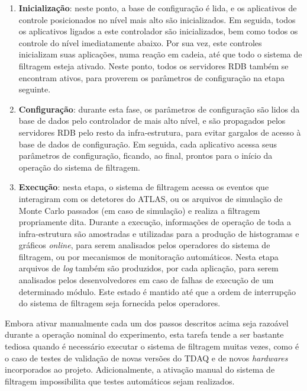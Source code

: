 \begin{enumerate}

\item \textbf{Inicialização}: neste ponto, a base de configuração é lida, e os aplicativos de controle posicionados no nível mais alto são inicializados. Em seguida, todos os aplicativos ligados a este controlador são inicializados, bem como todos os controle do nível imediatamente abaixo. Por sua vez, este controles inicializam suas aplicações, numa reação em cadeia, até que todo o sistema de filtragem esteja ativado. Neste ponto, todos os servidores RDB também se encontram ativos, para proverem os parâmetros de configuração na etapa seguinte.

\item \textbf{Configuração}: durante esta fase, os parâmetros de configuração são lidos da base de dados pelo controlador de mais alto nível, e são propagados pelos servidores RDB pelo resto da infra-estrutura, para evitar gargalos de acesso à base de dados de configuração. Em seguida, cada aplicativo acessa seus parâmetros de configuração, ficando, ao final, prontos para o início da operação do sistema de filtragem.

\item \textbf{Execução}: nesta etapa, o sistema de filtragem acessa os eventos que interagiram com os detetores do ATLAS, ou os arquivos de simulação de Monte Carlo passados (em caso de simulação) e realiza a filtragem propriamente dita. Durante a execução, informações de operação de toda a infra-estrutura são amostradas e utilizadas para a produção de histogramas e gráficos \emph{online}, para serem analisados pelos operadores do sistema de filtragem, ou por mecanismos de monitoração automáticos. Nesta etapa arquivos de \emph{log} também são produzidos, por cada aplicação, para serem analisados pelos desenvolvedores em caso de falhas de execução de um determinado módulo. Este estado é mantido até que a ordem de interrupção do sistema de filtragem seja fornecida pelos operadores.

\end{enumerate}

Embora ativar manualmente cada um dos passos descritos acima seja razoável durante a operação nominal do experimento, esta tarefa tende a ser bastante tediosa quando é necessário executar o sistema de filtragem muitas vezes, como é o caso de testes de validação de novas versões do TDAQ e de novos \emph{hardwares} incorporados ao projeto. Adicionalmente, a ativação manual do sistema de filtragem impossibilita que testes automáticos sejam realizados. 

